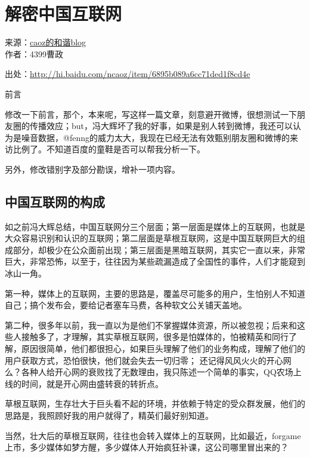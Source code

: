 \chapter{解密中国互联网}



\begin{center}
来源：\href{http://hi.baidu.com/ncaoz}{caoz的和谐blog}\\
作者：4399曹政\cite{caoz}
\end{center}


出处：\url{http://hi.baidu.com/ncaoz/item/6895b089a6cc71ded1f8cd4e}

前言

    修改一下前言，那个，本来呢，写这样一篇文章，刻意避开微博，很想测试一下朋友圈的传播效应；but，冯大辉坏了我的好事，如果是别人转到微博，我还可以认为是噪音数据，@fenng的威力太大，我现在已经无法有效甄别朋友圈和微博的来访比例了。不知道百度的童鞋是否可以帮我分析一下。

    另外，修改错别字及部分勘误，增补一项内容。


\section{中国互联网的构成}


如之前冯大辉总结，中国互联网分三个层面；第一层面是媒体上的互联网，也就是大众容易识别和认识的互联网；第二层面是草根互联网，这是中国互联网巨大的组成部分，却极少在公众面前出现；第三层面是黑暗互联网，其实它一直以来，非常巨大，非常恐怖，以至于，往往因为某些疏漏造成了全国性的事件，人们才能窥到冰山一角。


第一种，媒体上的互联网，主要的思路是，覆盖尽可能多的用户，生怕别人不知道自己；搞个发布会，要给记者塞车马费，各种软文公关铺天盖地。


第二种，很多年以前，我一直以为是他们不掌握媒体资源，所以被忽视；后来和这些人接触多了，才理解，其实草根互联网，很多是怕媒体的，怕被精英和同行了解，原因很简单，他们都很担心，如果巨头理解了他们的业务构成，理解了他们的用户获取方式，恐怕很快，他们就会失去一切归零； 还记得风风火火的开心网么？各种人给开心网的衰败找了无数理由，我只陈述一个简单的事实，QQ农场上线的时间，就是开心网由盛转衰的转折点。

草根互联网，生存壮大于巨头看不起的环境，并依赖于特定的受众群发展，他们的思路是，我照顾好我的用户就得了，精英们最好别知道。

当然，壮大后的草根互联网，往往也会转入媒体上的互联网，比如最近，forgame上市，多少媒体如梦方醒，多少媒体人开始疯狂补课，这公司哪里冒出来的？


